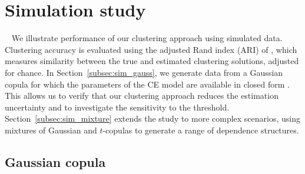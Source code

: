 \documentclass[
  12pt]{article}
\begin{document}
\section{Simulation study}~\label{sec:sim}
We illustrate performance of our clustering approach using simulated data. 
Clustering accuracy is evaluated using the adjusted Rand index (ARI) of \citet{Hubert1985-ys}, which measures similarity between the true and estimated clustering solutions, adjusted for chance.
In Section~\ref{subsec:sim_gauss}, we generate data from a Gaussian copula for which the parameters of the CE model are available in closed form \citep{Keef2013}.
This allows us to verify that our clustering approach reduces the estimation uncertainty and to investigate the sensitivity to the threshold.
Section~\ref{subsec:sim_mixture} extends the study to more complex scenarios, using mixtures of Gaussian and $t$-copulas to generate a range of dependence structures. 

\subsection{Gaussian copula}~\label{subsec:sim_gauss}
\end{document}

